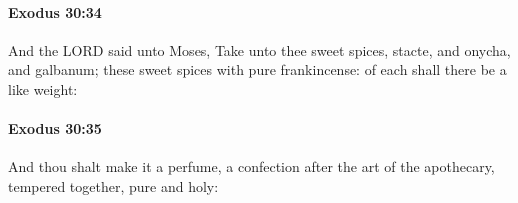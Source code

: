 		\paragraph{Exodus 30:34} %
			\label{EXODUS-30-34}

			And the LORD said unto Moses, Take unto thee sweet spices, stacte, and onycha, and galbanum; these sweet spices with pure frankincense: of each shall there be a like weight:


		\paragraph{Exodus 30:35} %
			\label{EXODUS-30-35}

			And thou shalt make it a perfume, a confection after the art of the apothecary, tempered together, pure and holy:


